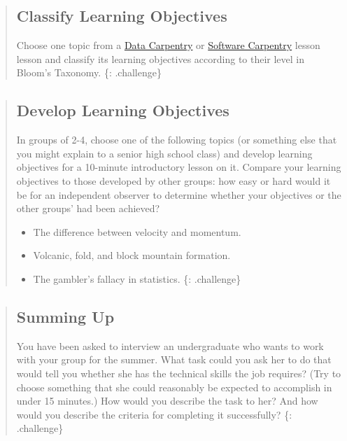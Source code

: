 \begin{quote}
\subsection{Classify Learning
Objectives}\label{classify-learning-objectives}

Choose one topic from a
\href{\{\{\%20site.dc_site\%20\}\}/lessons/}{Data Carpentry} or
\href{\{\{\%20site.swc_site\%20\}\}/lessons/}{Software Carpentry} lesson
lesson and classify its learning objectives according to their level in
Bloom's Taxonomy. \{: .challenge\}
\end{quote}

\begin{quote}
\subsection{Develop Learning
Objectives}\label{develop-learning-objectives}

In groups of 2-4, choose one of the following topics (or something else
that you might explain to a senior high school class) and develop
learning objectives for a 10-minute introductory lesson on it. Compare
your learning objectives to those developed by other groups: how easy or
hard would it be for an independent observer to determine whether your
objectives or the other groups' had been achieved?

\begin{itemize}
\itemsep1pt\parskip0pt
\item
  The difference between velocity and momentum.
\item
  Volcanic, fold, and block mountain formation.
\item
  The gambler's fallacy in statistics. \{: .challenge\}
\end{itemize}
\end{quote}

\begin{quote}
\subsection{Summing Up}\label{summing-up}

You have been asked to interview an undergraduate who wants to work with
your group for the summer. What task could you ask her to do that would
tell you whether she has the technical skills the job requires? (Try to
choose something that she could reasonably be expected to accomplish in
under 15 minutes.) How would you describe the task to her? And how would
you describe the criteria for completing it successfully? \{:
.challenge\}
\end{quote}

